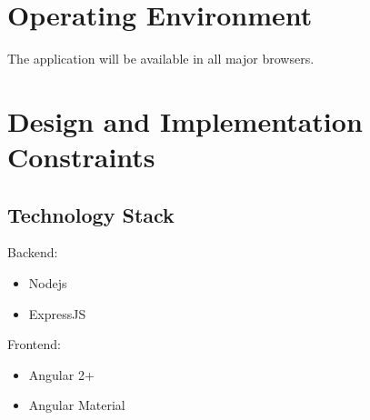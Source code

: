 \documentclass{scrreprt}
\begin{document}


\section{Operating Environment}
The application will be available in all major browsers.

\section{Design and Implementation Constraints}
\subsection{Technology Stack}
Backend:
\begin{itemize}
    \item Nodejs
    \item ExpressJS
\end{itemize}
Frontend:
\begin{itemize}
    \item Angular 2+
    \item Angular Material
\end{itemize}
\newpage
\end{document}
